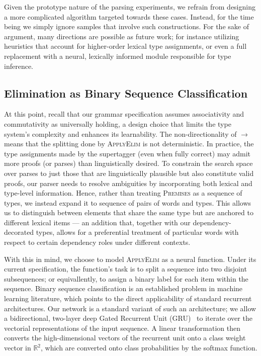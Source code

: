 Given the prototype nature of the parsing experiments, we refrain from designing a more complicated algorithm targeted towards these cases.
Instead, for the time being we simply ignore samples that involve such constructions.
For the sake of argument, many directions are possible as future work; for instance utilizing heuristics that account for higher-order lexical type assignments, or even a full replacement with a neural, lexically informed module responsible for type inference.

\subsection{Elimination as Binary Sequence Classification}
\label{subsec:model}
At this point, recall that our grammar specification assumes associativity and commutativity as universally holding, a design choice that limits the type system's complexity and enhances its learnability.
The non-directionality of $\rightarrow$ means that the splitting done by \textsc{ApplyElim} is not deterministic.
In practice, the type assignments made by the supertagger (even when fully correct) may admit more proofs (or parses) than linguistically desired.
To constrain the search space over parses to just those that are linguistically plausible but also constitute valid proofs, our parser needs to resolve ambiguities by incorporating both lexical and type-level information.
Hence, rather than treating \textsc{Premises} as a sequence of types, we instead expand it to sequence of pairs of words and types.
This allows us to distinguish between elements that share the same type but are anchored to different lexical items --- an addition that, together with our dependency-decorated types, allows for a preferential treatment of particular words with respect to certain dependency roles under different contexts.

With this in mind, we choose to model \textsc{ApplyElim} as a neural function.
Under its current specification, the function's task is to split a sequence into two disjoint subsequences; or equivallently, to assign a binary label for each item within the sequence.
Binary sequence classification is an established problem in machine learning literature, which points to the direct applicability of standard recurrent architectures.
Our network is a standard variant of such an architecture; we allow a bidirectional, two-layer deep Gated Recurrent Unit (GRU)~\cite{gru} to iterate over the vectorial representations of the input sequence.
A linear transformation then converts the high-dimensional vectors of the recurrent unit onto a class weight vector in $\mathbb{R}^2$, which are converted onto class probabilities by the softmax function.

